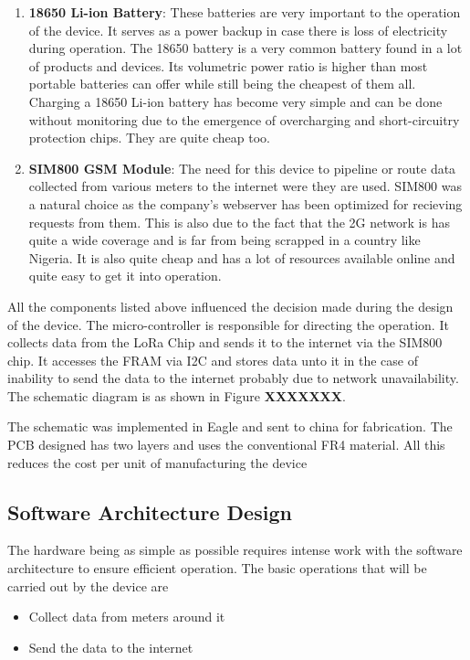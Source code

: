 \begin{enumerate}
\item \textbf{18650 Li-ion Battery}: These batteries are very important to the operation of the device. It serves as a power backup in case there is loss of electricity during operation. The 18650 battery is a very common battery found in a lot of products and devices. Its volumetric power ratio is higher than most portable batteries can offer while still being the cheapest of them all. Charging a 18650 Li-ion battery has become very simple and can be done without monitoring due to the emergence of overcharging and short-circuitry protection chips.  They are quite cheap too. 

\item \textbf{SIM800 GSM Module}: The need for this device to pipeline or route data collected from various meters to the internet were they are used. SIM800 was a natural choice as the company's webserver has been optimized for recieving requests from them. This is also due to the fact that the 2G network is has quite a wide coverage and is far from being scrapped in a country like Nigeria. It is also quite cheap and has a lot of resources available online and quite easy to get it into operation. 
\end{enumerate}

All the components listed above influenced the decision made during the design of the device. The micro-controller is responsible for directing the operation. It collects data from the LoRa Chip and sends it to the internet via the SIM800 chip. It accesses the FRAM via I2C and stores data unto it in the case of inability to send the data to the internet probably due to network unavailability. The schematic diagram is as shown in Figure \textbf{XXXXXXX}. 

The schematic was implemented in Eagle and sent to china for fabrication. The PCB designed has two layers and uses the conventional FR4 material. All this reduces the cost per unit of manufacturing the device

\subsection{Software Architecture Design}
The hardware being as simple as possible requires intense work with the software architecture to ensure efficient operation. The basic operations that will be carried out by the device are
\begin{itemize}
\item Collect data from meters around it
\item Send the data to the internet
\end{itemize} 


